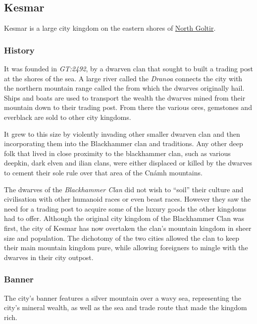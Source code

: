 \subsection{Kesmar}
\label{sec:Kesmar}

Kesmar is a large city kingdom on the eastern shores of
\hyperref[sec:Goltir]{North Goltir}.

\subsubsection{History}

It was founded in \emph{GT:2492}, by a dwarven clan that sought to built a
trading post at the shores of the sea. A large river called the \emph{Dranoa}
connects the city with the northern mountain range called the
 from which the dwarves originally hail. Ships
and boats are used to transport the wealth the dwarves mined from their
mountain down to their trading post. From there the various ores, gemstones
and everblack are sold to other city kingdoms.

It grew to this size by violently invading other smaller dwarven clan and then
incorporating them into the Blackhammer clan and traditions. Any other deep
folk that lived in close proximity to the blackhammer clan, such as various
deepkin, dark elven and ilian clans, were either displaced or killed by the
dwarves to cement their sole rule over that area of the Cnámh mountains.

The dwarves of the \emph{Blackhammer Clan} did not wish to ``soil'' their
culture and civilisation with other humanoid races or even beast
races. However they saw the need for a trading post to acquire some of the
luxury goods the other kingdoms had to offer. Although the original city
kingdom of the Blackhammer Clan was first, the city of Kesmar has now
overtaken the clan's mountain kingdom in sheer size and population. The
dichotomy of the two cities allowed the clan to keep their main mountain
kingdom pure, while allowing foreigners to mingle with the dwarves in their
city outpost.

\subsubsection{Banner}

The city's banner features a silver mountain over a wavy sea, representing the
city's mineral wealth, as well as the sea and trade route that made the
kingdom rich.


